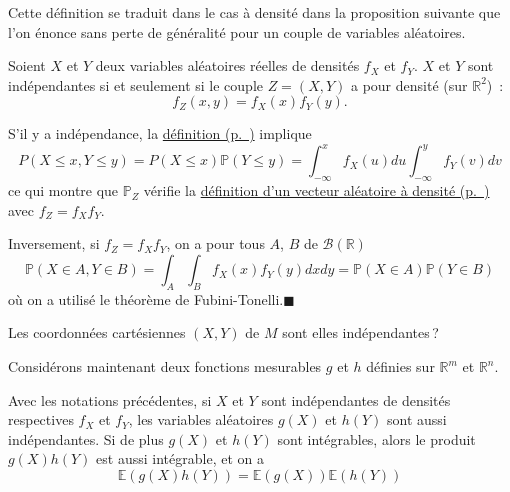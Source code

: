Cette définition se traduit dans le cas à densité dans la proposition
suivante que l'on énonce sans perte de généralité pour un couple de
variables aléatoires.

\begin{proposition}\label{II-caractuxe9risation-de-linduxe9pendance-cas-uxe0-densituxe9}

Soient \(X\) et \(Y\) deux variables aléatoires réelles de densités
\(f_X\) et \(f_Y\). \(X\) et \(Y\) sont indépendantes si et seulement si
le couple \(Z = (X,Y)\) a pour densité (sur \(\mathbb{R}^2\))~:
\[f_Z(x,y) = f_X(x)f_Y(y).\]
\end{proposition}

\begin{preuve}
S'il y a indépendance, la
\protect\hyperref[II-defvai]{définition (p.~\pageref*{II-defvai})}
implique
\[P(X\leq x, Y\leq y) = P(X\leq x) \mathbb{P}(Y\leq y) = \int_{-\infty}^x f_X(u) du \int_{-\infty}^y f_Y(v) dv\]
ce qui montre que \(\mathbb{P}_Z\) vérifie la
\protect\hyperref[II-defvect]{définition d'un vecteur aléatoire à
densité (p.~\pageref*{II-defvect})} avec \(f_Z=f_X f_Y\).

Inversement, si \(f_Z=f_X f_Y\), on a pour tous \(A\), \(B\) de
\(\mathcal{B}({\mathbb{R}})\)
\[\mathbb{P}(X\in A, Y\in B) = \int_A \int_B f_X(x) f_Y(y) dxdy = \mathbb{P}(X \in A)\mathbb{P}(Y \in B)\]
où on a utilisé le théorème de Fubini-Tonelli.\hfill$\blacksquare$
\end{preuve}

\label{II-exo-flechettebis}
Les coordonnées cartésiennes \((X,Y)\) de \(M\) sont elles
indépendantes\,?

Considérons maintenant deux fonctions mesurables \(g\) et \(h\) définies
sur \(\mathbb{R}^m\) et \(\mathbb{R}^n\).

\begin{proposition}\label{II-indep_fct}

Avec les notations précédentes, si \(X\) et \(Y\) sont indépendantes de
densités respectives \(f_X\) et \(f_Y\), les variables aléatoires
\(g(X)\) et \(h(Y)\) sont aussi indépendantes. Si de plus \(g(X)\) et
\(h(Y)\) sont intégrables, alors le produit \(g(X)h(Y)\) est aussi
intégrable, et on a
\[ \mathbb{E}(g(X)h(Y)) = \mathbb{E}(g(X))\mathbb{E}(h(Y))\]
\end{proposition}

